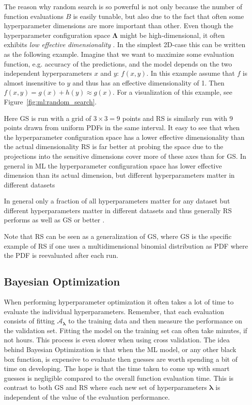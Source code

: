 The reason why random search is so powerful is not only because the number of function evaluations $B$ is easily tunable, but also due to the fact that often some hyperparameter dimensions are more important than other. Even though the hyperparameter configuration space $\bm{\Lambda}$  might be high-dimensional, it often exhibits \emph{low effective dimensionality} \autocite{bergstraRandomSearchHyperparameter2012}. In the simplest 2D-case this can be written as the following example. Imagine that we want to maximize some evaluation function, e.g. accuracy of the predictions, and the model depends on the two independent hyperparameters $x$ and $y$: $f(x, y)$. In this example assume that $f$ is almost insensitive to $y$ and thus has an effective dimensionality of 1. Then $f(x,y) = g(x) + h(y) \approx g(x)$. For a visualization of this example, see Figure~\ref{fig:ml:random_search}.

Here GS is run with a grid of $3\times3 = 9$ points and RS is similarly run with 9 points drawn from uniform PDFs in the same interval. It easy to see that when the hyperparameter configuration space has a lower effective dimensionality than the actual dimensionality RS is far better at probing the space due to the projections into the sensitive dimensions cover more of these axes than for GS. In general in ML the hyperparameter configuration space has lower effective dimension than its actual dimension, but different hyperparameters matter in different datasets

In general only a fraction of all hyperparameters matter for any dataset but different hyperparameters matter in different datasets and thus generally RS performs as well as GS or better \autocite{bergstraRandomSearchHyperparameter2012}. 

Note that RS can be seen as a generalization of GS, where GS is the specific example of RS if one uses a multidimensional binomial distribution as PDF where the PDF is reevaluated after each run. 

\subsection{Bayesian Optimization}
\label{subsec:ml:bayesian_optimization}
When performing hyperparameter optimization it often takes a lot of time to evaluate the individual hyperparameters. Remember, that each evaluation consists of fitting $\mathcal{A}_{\bm{\lambda}}$ to the training data and then measure the performance on the validation set. Fitting the model on the training set can often take minutes, if not hours. This process is even slower when using cross validation. The idea behind Bayesian Optimization is that when the ML model, or any other black box function, is expensive to evaluate then  guesses are worth spending a bit of time on developing. The hope is that the time taken to come up with smart guesses is negligible compared to the overall function evaluation time. This is contrast to both GS and RS where each new set of hyperparameters $\bm{\lambda}$ is independent of the value of the evaluation performance.

